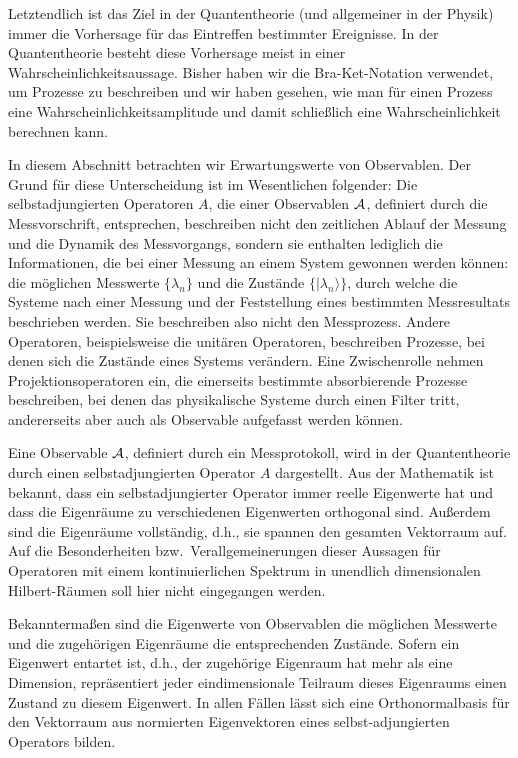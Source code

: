 Letztendlich ist das Ziel in der Quantentheorie (und allgemeiner in der Physik) immer
die Vorhersage f\"ur das Eintreffen bestimmter Ereignisse. 
In der Quantentheorie besteht
diese Vorhersage meist in einer Wahrscheinlichkeitsaussage. Bisher haben wir die Bra-Ket-Notation
verwendet, um Prozesse zu beschreiben und wir haben gesehen, wie man f\"ur einen Prozess eine
Wahrscheinlichkeitsamplitude und damit schlie\ss lich eine Wahrscheinlichkeit berechnen kann.

In diesem Abschnitt betrachten wir Erwartungswerte von Observablen.
Der Grund f\"ur diese Unterscheidung ist im Wesentlichen folgender: Die selbstadjungierten
Operatoren $A$, die einer Observablen ${\cal A}$, definiert durch die Messvorschrift,
entsprechen, beschreiben nicht den zeitlichen Ablauf der Messung und die Dynamik
des Messvorgangs, sondern sie enthalten lediglich die Informationen, die bei einer
Messung an einem System gewonnen werden k\"onnen: die m\"oglichen Messwerte 
$\{ \lambda_n\}$ und die Zust\"ande $\{ |\lambda_n\rangle \}$, 
durch welche die Systeme nach einer Messung und der Feststellung
eines bestimmten Messresultats beschrieben werden. Sie beschreiben also nicht
den Mess\-prozess. Andere Operatoren, beispielsweise die unit\"aren Operatoren,
beschreiben Prozesse, bei denen sich die Zust\"ande eines Systems ver\"andern.
Eine Zwischenrolle nehmen Projektionsoperatoren ein, die einerseits bestimmte
absorbierende Prozesse beschreiben, bei denen das physikalische Systeme durch
einen Filter tritt, andererseits aber auch als Observable aufgefasst werden k\"onnen.

Eine Observable ${\cal A}$, definiert durch ein Messprotokoll, wird in der Quantentheorie 
durch einen selbstadjungierten Operator $A$
dargestellt. Aus der Mathematik ist bekannt, dass ein selbstadjungierter Operator immer
reelle Eigenwerte hat und dass die Eigenr\"aume zu verschiedenen Eigenwerten
orthogonal sind. Au\ss erdem sind die Eigenr\"aume vollst\"andig, d.h., sie spannen den gesamten
Vektorraum auf. Auf die Besonderheiten bzw.\ Verallgemeinerungen dieser Aussagen f\"ur
Operatoren mit einem kontinuierlichen Spektrum in unendlich dimensionalen Hilbert-R\"aumen   
soll hier nicht eingegangen werden.

Bekannterma\ss en sind die Eigenwerte von Observablen die m\"oglichen Messwerte und
die zugeh\"origen Eigenr\"aume die entsprechenden Zust\"ande. Sofern ein Eigenwert entartet
ist, d.h., der zugeh\"orige Eigenraum hat mehr als eine Dimension, repr\"asentiert jeder eindimensionale
Teilraum dieses Eigenraums einen Zustand zu diesem Eigenwert. In allen F\"allen l\"asst sich
eine Orthonormalbasis f\"ur den Vektorraum aus normierten Eigenvektoren eines selbst-adjungierten
Operators bilden.

